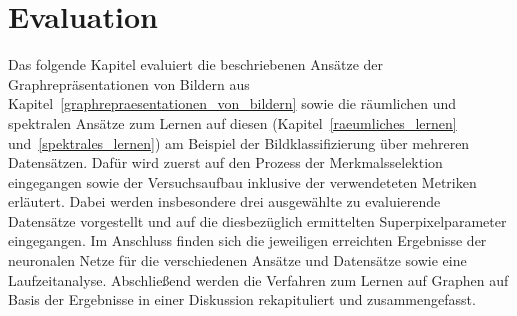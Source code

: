\chapter{Evaluation}
\label{evaluation}

Das folgende Kapitel evaluiert die beschriebenen Ansätze der Graphrepräsentationen von Bildern aus Kapitel~\ref{graphrepraesentationen_von_bildern} sowie die räumlichen und spektralen Ansätze zum Lernen auf diesen (Kapitel~\ref{raeumliches_lernen} und~\ref{spektrales_lernen}) am Beispiel der Bildklassifizierung über mehreren Datensätzen.
Dafür wird zuerst auf den Prozess der Merkmalsselektion eingegangen sowie der Versuchsaufbau inklusive der verwendeteten Metriken erläutert.
Dabei werden insbesondere drei ausgewählte zu evaluierende Datensätze vorgestellt und auf die diesbezüglich ermittelten Superpixelparameter eingegangen.
Im Anschluss finden sich die jeweiligen erreichten Ergebnisse der neuronalen Netze für die verschiedenen Ansätze und Datensätze sowie eine Laufzeitanalyse.
Abschließend werden die Verfahren zum Lernen auf Graphen auf Basis der Ergebnisse in einer Diskussion rekapituliert und zusammengefasst.






